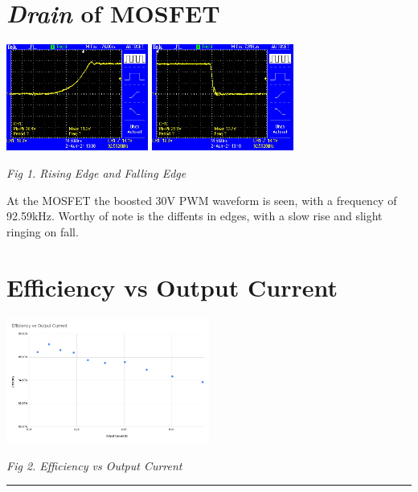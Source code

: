 \documentclass[11pt]{article}
\begin{document}
\begin{preview}
    \section{\textit{Drain} of MOSFET}
    \begin{center}
        \includegraphics[width=0.35\textwidth]{img/rising.JPG}
        \includegraphics[width=0.35\textwidth]{img/falling.JPG}

        \textit{Fig 1. Rising Edge and Falling Edge}
    \end{center}

    At the MOSFET the boosted 30V PWM waveform is seen, with a frequency of 92.59kHz. Worthy of note is the diffents in edges, with a slow rise and slight ringing on fall.
    
    \section{Efficiency vs Output Current}
    \begin{center}
        \includegraphics[width=0.5\textwidth]{img/eff.png}
        
        \textit{Fig 2. Efficiency vs Output Current}
    \end{center}
    \hrule
\end{preview}
\end{document}
